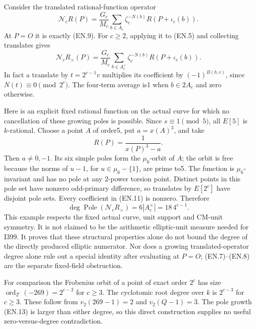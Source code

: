 Consider the translated rational-function operator
\[
 \mathcal N_c R(P)=\frac{G_c}{M_c}
       \sum_{b\in A_c}\zeta_c^{-N(b)}R(P+\iota_c(b)).         \tag{EN.10}
\]
At $P=O$ it is exactly (EN.9).  For $c\geq2$, applying it to (EN.5)
and collecting translates gives
\[
 \mathcal N_c R_\times(P)=\frac{G_c}{M_c}
       \sum_{b\in A_c^\times}\zeta_c^{-N(b)}R(P+\iota_c(b)). \tag{EN.11}
\]
In fact a translate by $t=2^{c-1}v$ multiplies its coefficient by
$(-1)^{B(b,v)}$, since $N(t)\equiv0\pmod{2^c}$.
The four-term average is1 when $b\in2A_c$ and zero otherwise.

Here is an explicit fixed rational function on the actual curve for
which no cancellation of these growing poles is possible.  Since
$s\equiv1\pmod5$, all $E[5]$ is $k$-rational.  Choose a point $A$ of
order5, put $a=x(A)^3$, and take
\[
 R(P)=\frac1{x(P)^3-a}.                                      \tag{EN.12}
\]
Then $a\ne0,-1$.  Its six simple poles form the $\mu_6$-orbit of $A$;
the orbit is free because the norms of $u-1$, for $u\in\mu_6-\{1\}$,
are prime to5.  The function is $\mu_6$-invariant and has no pole at
any $2$-power torsion point.  Distinct points in this pole set have
nonzero odd-primary difference, so translates by $E[2^c]$ have disjoint
pole sets.  Every coefficient in (EN.11) is nonzero.  Therefore
\[
 \deg\operatorname{Pole}(\mathcal N_c R_\times)
        =6|A_c^\times|=18\,4^{c-1}.                           \tag{EN.13}
\]
This example respects the fixed actual curve, unit support and CM-unit
symmetry.  It is not claimed to be the arithmetic elliptic-unit measure
needed for I399.  It proves that these structural properties alone do
not bound the degree of the directly produced elliptic numerator.
Nor does a growing translated-operator degree alone rule out a special
identity after evaluating at $P=O$; (EN.7)--(EN.8) are the separate
fixed-field obstruction.

For comparison the Frobenius orbit of a point of exact order $2^c$
has size $\operatorname{ord}_{2^c}(-269)=2^{c-2}$ for $c\geq3$.
The cyclotomic root degree over $k$ is $2^{c-3}$ for $c\geq3$.
These follow from $v_2(269-1)=2$ and $v_2(Q-1)=3$.
The pole growth (EN.13) is larger than either degree, so this direct
construction supplies no useful zero-versus-degree contradiction.

